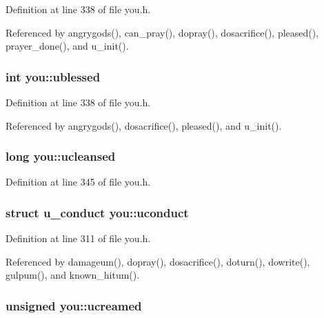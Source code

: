 Definition at line 338 of file you.\+h.



Referenced by angrygods(), can\+\_\+pray(), dopray(), dosacrifice(), pleased(), prayer\+\_\+done(), and u\+\_\+init().

\hypertarget{structyou_ac52be91176a57cbafbcf1703ef9623e2}{
\subsubsection[{ublessed}]{\setlength{\rightskip}{0pt plus 5cm}int you\+::ublessed}}\label{structyou_ac52be91176a57cbafbcf1703ef9623e2}


Definition at line 338 of file you.\+h.



Referenced by angrygods(), dosacrifice(), pleased(), and u\+\_\+init().

\hypertarget{structyou_a1f1b1b1396768943e6d28f1bb7f92181}{
\subsubsection[{ucleansed}]{\setlength{\rightskip}{0pt plus 5cm}long you\+::ucleansed}}\label{structyou_a1f1b1b1396768943e6d28f1bb7f92181}


Definition at line 345 of file you.\+h.

\hypertarget{structyou_ac34f4744daa7ff78a6ff556ade5b9601}{
\subsubsection[{uconduct}]{\setlength{\rightskip}{0pt plus 5cm}struct {\bf u\+\_\+conduct} you\+::uconduct}}\label{structyou_ac34f4744daa7ff78a6ff556ade5b9601}


Definition at line 311 of file you.\+h.



Referenced by damageum(), dopray(), dosacrifice(), doturn(), dowrite(), gulpum(), and known\+\_\+hitum().

\hypertarget{structyou_a8a8bfe7cf93acf5795d7d7fdfbc5ef40}{
\subsubsection[{ucreamed}]{\setlength{\rightskip}{0pt plus 5cm}unsigned you\+::ucreamed}}\label{structyou_a8a8bfe7cf93acf5795d7d7fdfbc5ef40}


